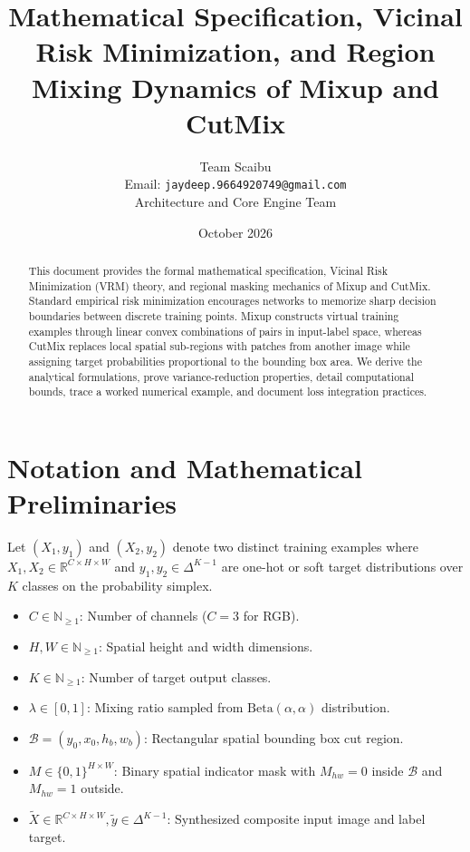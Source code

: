 \documentclass[11pt,a4paper]{article}
\title{\textbf{Mathematical Specification, Vicinal Risk Minimization, and Region Mixing Dynamics of Mixup and CutMix}}
\author{Team Scaibu \\ \small Email: \texttt{jaydeep.9664920749@gmail.com} \\ \small Architecture and Core Engine Team}
\date{October 2026}
\theoremstyle{definition}
\begin{document}
\maketitle

\begin{abstract}
This document provides the formal mathematical specification, Vicinal Risk Minimization (VRM) theory, and regional masking mechanics of Mixup and CutMix. Standard empirical risk minimization encourages networks to memorize sharp decision boundaries between discrete training points. Mixup constructs virtual training examples through linear convex combinations of pairs in input-label space, whereas CutMix replaces local spatial sub-regions with patches from another image while assigning target probabilities proportional to the bounding box area. We derive the analytical formulations, prove variance-reduction properties, detail computational bounds, trace a worked numerical example, and document loss integration practices.
\end{abstract}

\section{Notation and Mathematical Preliminaries}

Let $(X_1, y_1)$ and $(X_2, y_2)$ denote two distinct training examples where $X_1, X_2 \in \mathbb{R}^{C \times H \times W}$ and $y_1, y_2 \in \Delta^{K-1}$ are one-hot or soft target distributions over $K$ classes on the probability simplex.

\begin{itemize}
    \item $C \in \mathbb{N}_{\ge 1}$: Number of channels ($C = 3$ for RGB).
    \item $H, W \in \mathbb{N}_{\ge 1}$: Spatial height and width dimensions.
    \item $K \in \mathbb{N}_{\ge 1}$: Number of target output classes.
    \item $\lambda \in [0, 1]$: Mixing ratio sampled from $\text{Beta}(\alpha, \alpha)$ distribution.
    \item $\mathcal{B} = (y_0, x_0, h_b, w_b)$: Rectangular spatial bounding box cut region.
    \item $M \in \{0, 1\}^{H \times W}$: Binary spatial indicator mask with $M_{hw} = 0$ inside $\mathcal{B}$ and $M_{hw} = 1$ outside.
    \item $\tilde{X} \in \mathbb{R}^{C \times H \times W}, \tilde{y} \in \Delta^{K-1}$: Synthesized composite input image and label target.
\end{itemize}
\end{document}
